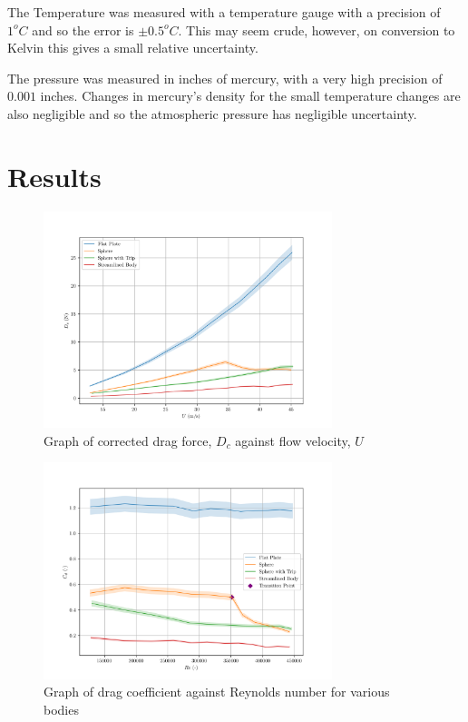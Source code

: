 \documentclass[8pt]{article}
\begin{document}
The Temperature was measured with a temperature gauge with a precision of $1^oC$ and so the error is $\pm 0.5^oC$. This may seem crude, however, on conversion to Kelvin this gives a small relative uncertainty.

The pressure was measured in inches of mercury, with a very high precision of $0.001$ inches.
Changes in mercury's density for the small temperature changes are also negligible and so the atmospheric pressure has negligible uncertainty.

\section{Results}

\begin{figure}[H]
    \centering
    \includegraphics[width=0.75\textwidth]{U_vs_D.png}
    \caption{Graph of corrected drag force, $D_c$ against flow velocity, $U$}
    \label{fig:graph1}
\end{figure}

\begin{figure}[H]
    \centering
    \includegraphics[width=0.75\textwidth]{Re_vs_Cd.png}
    \caption{Graph of drag coefficient against Reynolds number for various bodies}
    \label{fig:figure1}
\end{figure}
\end{document}
